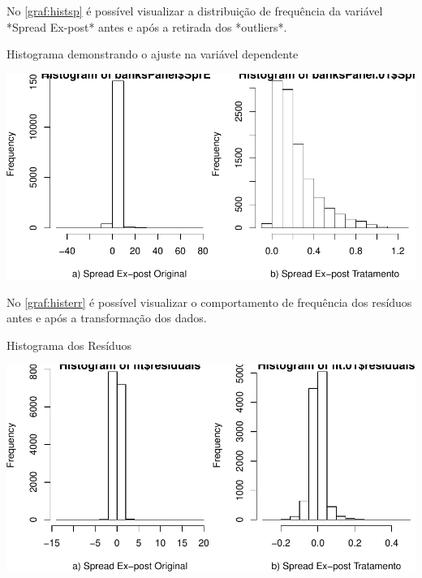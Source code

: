 \documentclass[
  12pt,
  12pt,
  openright,
  oneside,
  a4paper,
  chapter=TITLE,
  section=TITLE,
  subsection=TITLE,
  subsubsection=TITLE,
  english,
  portugues,
  sumario=tradicional]{abntex2}
\begin{document}
\begin{apendicesenv}
No \autoref{graf:histsp} é possível visualizar a distribuição de frequência da variável *Spread Ex-post* antes e após a retirada dos *outliers*.

\begin{grafico}[!hbtp]
\vspace{20pt}
\caption{Histograma demonstrando o ajuste na variável dependente}
\vspace{-4mm}

\begin{center}\includegraphics[width=1\linewidth]{12-exportedfigures/hist.SprEp-1} \end{center}
\vspace{3mm}
\label{graf:histsp}
\vspace{-2mm}
\end{grafico}

No \autoref{graf:histerr} é possível visualizar o comportamento de frequência dos resíduos antes e após a transformação dos dados.

\begin{grafico}[!hbtp]
\vspace{20pt}
\caption{Histograma dos Resíduos}
\vspace{-4mm}

\begin{center}\includegraphics[width=1\linewidth]{12-exportedfigures/hist.residuals-1} \end{center}
\vspace{3mm}
\label{graf:histerr}
\vspace{-2mm}
\end{grafico}



\end{apendicesenv}
\end{document}
